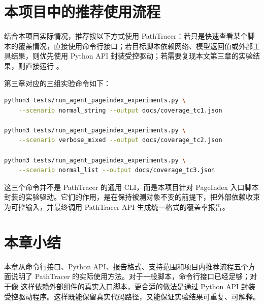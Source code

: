 \section{本项目中的推荐使用流程}

结合本项目实际情况，推荐按以下方式使用 PathTracer：若只是快速查看某个脚本的覆盖情况，直接使用命令行接口；若目标脚本依赖网络、模型返回值或外部工具结果，则优先使用 Python API 封装受控驱动；若需要复现本文第三章的实验结果，则直接运行 。

第三章对应的三组实验命令如下：

\begin{lstlisting}[language=bash, caption={本项目推荐的实验执行命令}]
python3 tests/run_agent_pageindex_experiments.py \
    --scenario normal_string --output docs/coverage_tc1.json

python3 tests/run_agent_pageindex_experiments.py \
    --scenario verbose_mixed --output docs/coverage_tc2.json

python3 tests/run_agent_pageindex_experiments.py \
    --scenario normal_list --output docs/coverage_tc3.json
\end{lstlisting}

这三个命令并不是 PathTracer 的通用 CLI，而是本项目针对 PageIndex 入口脚本封装的实验驱动。它们的作用，是在保持被测对象不变的前提下，把外部依赖收束为可控输入，并最终调用 PathTracer API 生成统一格式的覆盖率报告。

\section{本章小结}

本章从命令行接口、Python API、报告格式、支持范围和项目内推荐流程五个方面说明了 PathTracer 的实际使用方法。对于一般脚本，命令行接口已经足够；对于像  这样依赖外部组件的真实入口脚本，更合适的做法是通过 Python API 封装受控驱动程序。这样既能保留真实代码路径，又能保证实验结果可重复、可解释。
